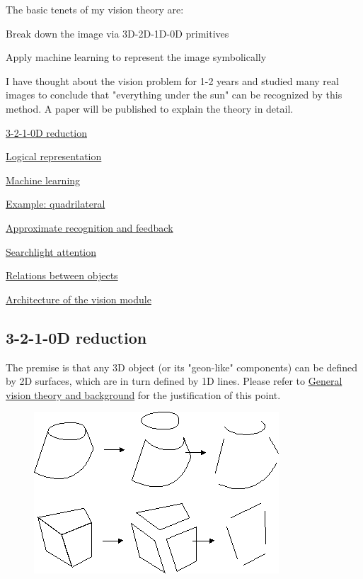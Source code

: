 The basic tenets of my vision theory are:
\begin{compactenum}
	\item  Break down the image via 3D-2D-1D-0D primitives
	\item  Apply  machine learning to represent the image symbolically
\end{compactenum}

I have thought about the vision problem for 1-2 years and studied many real images to conclude that "everything under the sun" can be recognized by this method. A  paper will be published to explain the theory in detail.
\underconst
\begin{compactenum}
	\item \hyperlink{3210DReduction}{3-2-1-0D reduction}
	\item \hyperlink{LogicalRepresentation}{Logical representation}
	\item \hyperlink{MachineLearning}{Machine learning}
	\item \hyperlink{Example}{Example: quadrilateral}
	\item \hyperlink{ApproximateRecognition}{Approximate recognition and feedback}
	\item \hyperlink{Attention}{Searchlight attention}
	\item \hyperlink{Relations}{Relations between objects}
	\item \hyperlink{Architecture}{Architecture of the vision module}
\end{compactenum}

\subsection{3-2-1-0D reduction}

The premise is that any 3D object (or its "geon-like" components) can be defined by  2D surfaces, which are in turn defined by 1D lines. Please refer to \href{Vis-Background.htm}{General vision theory and background} for the justification of this point.

\begin{figure}[H]
\centering
\includegraphics[scale=0.6]{PolygonDecomposition.PNG}
\end{figure}

